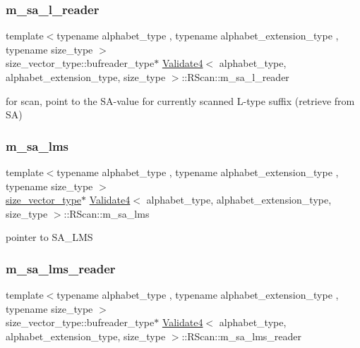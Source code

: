 \subsubsection{\texorpdfstring{m\+\_\+sa\+\_\+l\+\_\+reader}{m\_sa\_l\_reader}}
{\footnotesize\ttfamily template$<$typename alphabet\+\_\+type , typename alphabet\+\_\+extension\+\_\+type , typename size\+\_\+type $>$ \\
size\+\_\+vector\+\_\+type\+::bufreader\+\_\+type$\ast$ \hyperlink{class_validate4}{Validate4}$<$ alphabet\+\_\+type, alphabet\+\_\+extension\+\_\+type, size\+\_\+type $>$\+::R\+Scan\+::m\+\_\+sa\+\_\+l\+\_\+reader\hspace{0.3cm}{\ttfamily [private]}}



for scan, point to the S\+A-\/value for currently scanned L-\/type suffix (retrieve from SA) 

\mbox{\label{struct_validate4_1_1_r_scan_a7427660483d5beb9bbf8e6a69c291c25}} 
\subsubsection{\texorpdfstring{m\+\_\+sa\+\_\+lms}{m\_sa\_lms}}
{\footnotesize\ttfamily template$<$typename alphabet\+\_\+type , typename alphabet\+\_\+extension\+\_\+type , typename size\+\_\+type $>$ \\
\hyperlink{class_validate4_a46ea31a0a4b23f583806792160421d15}{size\+\_\+vector\+\_\+type}$\ast$ \hyperlink{class_validate4}{Validate4}$<$ alphabet\+\_\+type, alphabet\+\_\+extension\+\_\+type, size\+\_\+type $>$\+::R\+Scan\+::m\+\_\+sa\+\_\+lms\hspace{0.3cm}{\ttfamily [private]}}



pointer to S\+A\+\_\+\+L\+MS 

\mbox{\label{struct_validate4_1_1_r_scan_a986bdf3f5bc40e0d41939f699ac68c2c}} 
\subsubsection{\texorpdfstring{m\+\_\+sa\+\_\+lms\+\_\+reader}{m\_sa\_lms\_reader}}
{\footnotesize\ttfamily template$<$typename alphabet\+\_\+type , typename alphabet\+\_\+extension\+\_\+type , typename size\+\_\+type $>$ \\
size\+\_\+vector\+\_\+type\+::bufreader\+\_\+type$\ast$ \hyperlink{class_validate4}{Validate4}$<$ alphabet\+\_\+type, alphabet\+\_\+extension\+\_\+type, size\+\_\+type $>$\+::R\+Scan\+::m\+\_\+sa\+\_\+lms\+\_\+reader\hspace{0.3cm}{\ttfamily [private]}}



